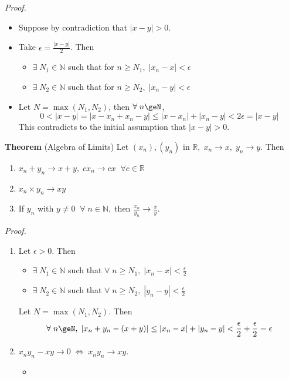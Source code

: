 \documentclass[12pt]{article}
\begin{document}
\vspace{1\baselineskip}
\begin{block}{\sl Proof.} 
\begin{itemize}
    \item Suppose by contradiction that $|x-y|>0$.
    \item Take $\epsilon=\frac{|x-y|}{2}$. Then
    \begin{itemize}
        \item $\exists\;N_1\in\mathbb{N}$ such that for $n\ge N_1,\;|x_n-x|<\epsilon$
        \item $\exists\;N_2\in\mathbb{N}$ such that for $n\ge N_2,\;|x_n-y|<\epsilon$
    \end{itemize}
    \item Let $N= \max(N_1,N_2)$, then $\forall\;n\geN$,
    $$0<|x-y| = |x-x_n+x_n-y| \le |x-x_n|+|x_n-y|<2\epsilon = |x-y|$$
    This contradicts to the initial assumption that $|x-y|>0$.
\end{itemize}
\end{block}

\newpage
\begin{block}{\bf Theorem} (Algebra of Limits) Let $(x_n), (y_n)$ in $\mathbb{R},\; x_n\to x,\; y_n\to y$. Then
\begin{enumerate}[label=(\roman*)]
    \item $x_n+y_n \to x+y,\; cx_n\to cx\;\;\forall c\in\mathbb{R}$
    \item $x_n\times y_n \to xy$
    \item If $y_n$ with $y\neq 0\;\;\forall\;n\in\mathbb{N},\;$then $\frac{x_n}{y_n}\to \frac{x}{y}.$
\end{enumerate}
\end{block}

\vspace{1\baselineskip}
\begin{block}{\sl Proof.}
\begin{enumerate}[label=(\roman*)]
    \item Let $\epsilon >0$. Then 
    \begin{itemize}
        \item $\exists\;N_1\in\mathbb{N}$ such that $\forall\;n\ge N_1,\;|x_n-x|<\frac{\epsilon}{2}$
        \item $\exists\;N_2\in\mathbb{N}$ such that $\forall\;n\ge N_2,\;|y_n-y|<\frac{\epsilon}{2}$
    \end{itemize}
    Let $N=\max(N_1,N_2)$. Then 
    $$\forall\;n\geN,\;|x_n+y_n-(x+y)|\le |x_n-x|+|y_n-y|<\frac{\epsilon}{2}+\frac{\epsilon}{2}=\epsilon$$
    
    \item $x_ny_n - xy \to 0\;\Leftrightarrow\; x_ny_n\to xy$.
    \begin{itemize}
        \item 
    \end{itemize}
    
\end{enumerate}
\end{block}
\end{document}
